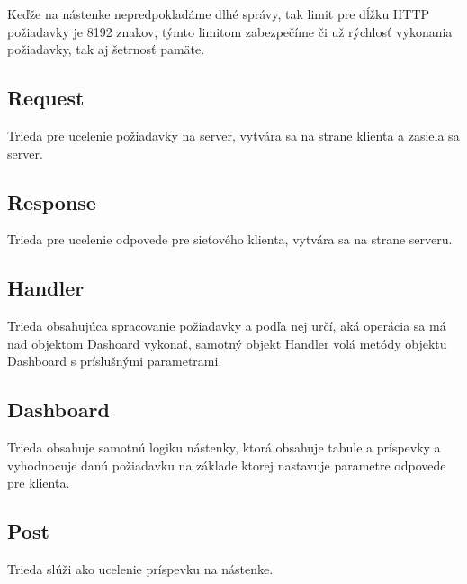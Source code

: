 \documentclass[a4paper,12pt,oneside]{article}
\theoremstyle{definition}
\theoremstyle{definition}
\theoremstyle{definition}
\begin{document}
Keďže na nástenke nepredpokladáme dlhé správy, tak limit pre dĺžku HTTP požiadavky je 8192 znakov, týmto limitom zabezpečíme či už rýchlosť vykonania požiadavky, tak aj šetrnosť pamäte.

\subsection{Request}
Trieda pre ucelenie požiadavky na server, vytvára sa na strane klienta a zasiela sa server.

\subsection{Response}
Trieda pre ucelenie odpovede pre sieťového klienta, vytvára sa na strane serveru.

\subsection{Handler}
Trieda obsahujúca spracovanie požiadavky a podľa nej určí, aká operácia sa má nad objektom Dashoard vykonať, samotný objekt Handler volá metódy objektu Dashboard s príslušnými parametrami.

\subsection{Dashboard}
Trieda obsahuje samotnú logiku nástenky, ktorá obsahuje tabule a príspevky a vyhodnocuje danú požiadavku na základe ktorej nastavuje parametre odpovede pre klienta.

\subsection{Post}
Trieda slúži ako ucelenie príspevku na nástenke.









\end{document}
